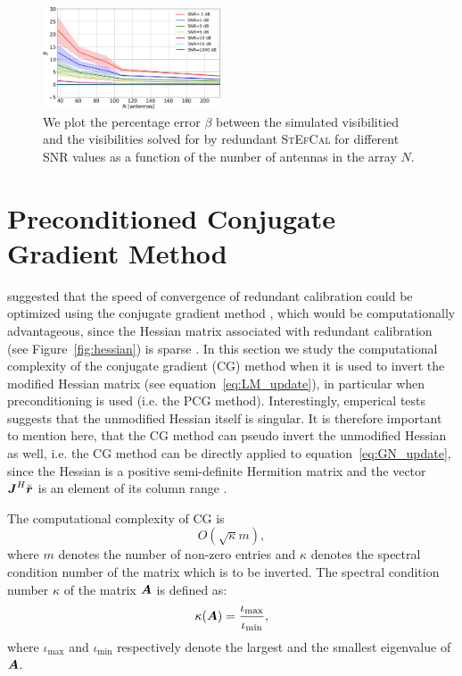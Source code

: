 \documentclass[useAMS,usenatbib]{mn2e}
\newcommand{\bA}{\bmath{A}}
\newcommand{\br}{\bmath{r}}
\newcommand{\bJ}{\bmath{J}}
\begin{document}
\begin{figure}
\includegraphics[width=0.47\textwidth]{./prec_error.pdf} 
\caption{We plot the percentage error $\beta$ between the simulated visibilitied and the visibilities solved for by redundant \textsc{StEfCal} for different SNR values as a function of the number of antennas in the array $N$.}
\label{fig:prec_error}
\end{figure}


\section{Preconditioned Conjugate Gradient Method}
\label{sec:pcg}
\citet{Liu2010} suggested that the speed of convergence of redundant calibration could be optimized using the 
conjugate gradient method \citep{Hestenes1952}, which would be computationally advantageous, since the Hessian matrix associated 
with redundant calibration (see Figure~\ref{fig:hessian}) is sparse \citep{Reid1971}. In this section we study the computational complexity
of the conjugate gradient (CG) method when it is used to invert the modified Hessian matrix (see equation~\ref{eq:LM_update}), 
in particular when preconditioning is used (i.e. the PCG method). Interestingly, emperical tests suggests that the unmodified Hessian itself is singular. It is therefore important to mention here, that the CG method 
can pseudo invert the unmodified Hessian as well, i.e. the CG method can be directly applied to equation~\ref{eq:GN_update}, since the Hessian is a positive semi-definite Hermition matrix and the vector $\bJ^H\breve{\br}$ is an element of its column range \citep{Lu2015}.


The computational complexity of CG is  
\begin{equation}
\label{eq:cg_bound}
O(\sqrt{\kappa}m), 
\end{equation}
where $m$ denotes the number of non-zero entries and $\kappa$ denotes the spectral 
condition number of the matrix which is to be inverted. The spectral condition number $\kappa$ of the matrix $\bA$ is defined as:
\begin{equation}
\label{eq:kappa}
\kappa(\bA) = \frac{\iota_{\textrm{max}}}{\iota_{\textrm{min}}}, 
\end{equation}
where $\iota_{\textrm{max}}$ and $\iota_{\textrm{min}}$ respectively denote the largest and the smallest eigenvalue of $\bA$.
\end{document}
